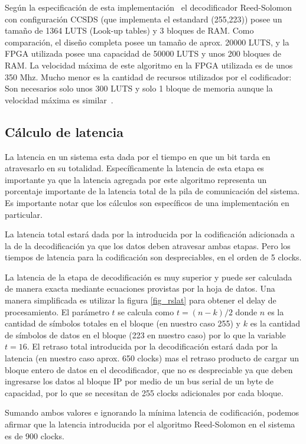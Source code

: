 Según la especificación de esta implementación~\cite{Xilinx:DS252} el decodificador Reed-Solomon con configuración CCSDS (que implementa el estandard (255,223)) posee un tamaño de 1364 LUTS (Look-up tables) y 3 bloques de RAM. Como comparación, el diseño completa posee un tamaño de aprox. 20000 LUTS, y la FPGA utilizada posee una capacidad de 50000 LUTS y unos 200 bloques de RAM. La velocidad máxima de este algoritmo en la FPGA utilizada es de unos 350 Mhz.
Mucho menor es la cantidad de recursos utilizados por el codificador: Son necesarios solo unos 300 LUTS y solo 1 bloque de memoria aunque la velocidad máxima es similar~\cite{Xilinx:DS251}.

\subsection{Cálculo de latencia}
La latencia en un sistema esta dada por el tiempo en que un bit tarda en atravesarlo en su totalidad. Específicamente la latencia de esta etapa es importante ya que la latencia agregada por este algoritmo representa un porcentaje importante de la latencia total de la pila de comunicación del sistema. Es importante notar que los cálculos son específicos de una implementación en particular. 

La latencia total estará dada por la introducida por la codificación adicionada a la de la decodificación ya que los datos deben atravesar ambas etapas. Pero los tiempos de latencia para la codificación son despreciables, en el orden de 5 clocks. 

La latencia de la etapa de decodificación es muy superior y puede ser calculada de manera exacta mediante ecuaciones provistas por la hoja de datos. Una manera simplificada es utilizar la figura \ref{fig_rslat} para obtener el delay de procesamiento. El parámetro $t$ se calcula como $t=(n-k)/2$ donde $n$ es la cantidad de símbolos totales en el bloque (en nuestro caso 255) y $k$ es la cantidad de símbolos de datos en el bloque (223 en nuestro caso) por lo que la variable $t=16$.  El retraso total introducida por la decodificación estará dada por la latencia (en nuestro caso aprox. 650 clocks) mas el retraso producto de cargar un bloque entero de datos en el decodificador, que no es despreciable ya que deben ingresarse los datos al bloque IP por medio de un bus serial de un byte de capacidad, por lo que se necesitan de 255 clocks adicionales por cada bloque. 

Sumando ambos valores e ignorando la mínima latencia de codificación, podemos afirmar que la latencia introducida por el algoritmo Reed-Solomon en el sistema es de 900 clocks.

